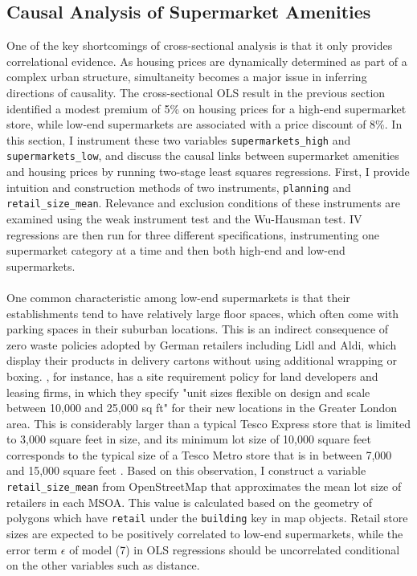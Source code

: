 \documentclass{article}
\begin{document}
\subsection{Causal Analysis of Supermarket Amenities} \label{subsection:iv}
One of the key shortcomings of cross-sectional analysis is that it only provides correlational evidence. As housing prices are dynamically determined as part of a complex urban structure, simultaneity becomes a major issue in inferring directions of causality. The cross-sectional OLS result in the previous section identified a modest premium of 5\% on housing prices for a high-end supermarket store, while low-end supermarkets are associated with a price discount of 8\%. In this section, I instrument these two variables \texttt{supermarkets\_high} and \texttt{supermarkets\_low}, and discuss the causal links between supermarket amenities and housing prices by running two-stage least squares regressions. First, I provide intuition and construction methods of two instruments, \texttt{planning} and \texttt{retail\_size\_mean}. Relevance and exclusion conditions of these instruments are examined using the weak instrument test and the Wu-Hausman test. IV regressions are then run for three different specifications, instrumenting one supermarket category at a time and then both high-end and low-end supermarkets.\\\\
One common characteristic among low-end supermarkets is that their establishments tend to have relatively large floor spaces, which often come with parking spaces in their suburban locations. This is an indirect consequence of zero waste policies adopted by German retailers including Lidl and Aldi, which display their products in delivery cartons without using additional wrapping or boxing. \citet{LidlUK2018IntroduceExpand}, for instance, has a site requirement policy for land developers and leasing firms, in which they specify "unit sizes flexible on design and scale between 10,000 and 25,000 sq ft" for their new locations in the Greater London area. This is considerably larger than a typical Tesco Express store that is limited to 3,000 square feet in size, and its minimum lot size of 10,000 square feet corresponds to the typical size of a Tesco Metro store that is in between 7,000 and 15,000 square feet \citep{Vasquez-Nicholson2016UK2013}. Based on this observation, I construct a variable \texttt{retail\_size\_mean} from OpenStreetMap that approximates the mean lot size of retailers in each MSOA. This value is calculated based on the geometry of polygons which have \texttt{retail} under the \texttt{building} key in map objects. Retail store sizes are expected to be positively correlated to low-end supermarkets, while the error term $\epsilon$ of model (7) in OLS regressions should be uncorrelated conditional on the other variables such as distance.\\\\
\end{document}
